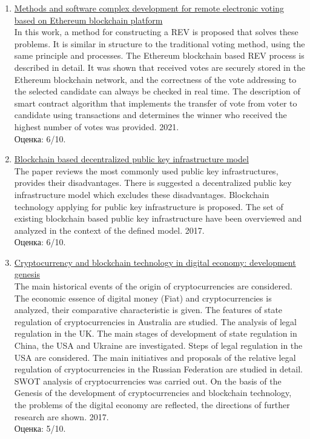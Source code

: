 \documentclass[a4paper, 12pt]{report}		%
\begin{document}
\begin{enumerate}
\item \href{https://ruslan.library.spbstu.ru/pwb/detail?db=ANALITS2005&id=8c229831-1a03-4873-b151-28e250859458}{Methods and software complex development for remote electronic voting based on Ethereum blockchain platform}\\
In this work, a method for constructing a REV is proposed that solves these problems. It is similar in structure to the traditional voting method, using the same principle and processes. The Ethereum blockchain based REV process is described in detail. It was shown that received votes are securely stored in the Ethereum blockchain network, and the correctness of the vote addressing to the selected candidate can always be checked in real time. The description of smart contract algorithm that implements the transfer of vote from voter to candidate using transactions and determines the winner who received the highest number of votes was provided. 2021.\\
Оценка: 6/10.
\item \href{https://ruslan.library.spbstu.ru/pwb/detail?db=ANALITS2005&id=RU%5CSPSTU%5Canalits2005%5C349269}{Blockchain based decentralized public key infrastructure model}\\
The paper reviews the most commonly used public key infrastructures, provides their disadvantages. There is suggested a decentralized public key infrastructure model which excludes these disadvantages. Blockchain technology applying for public key infrastructure is proposed. The set of existing blockchain based public key infrastructure have been overviewed and analyzed in the context of the defined model. 2017.\\
Оценка: 6/10.
\item \href{https://ruslan.library.spbstu.ru/pwb/detail?db=ANALITS2005&id=RU%5CSPSTU%5Canalits2005%5C349543}{Cryptocurrency and blockchain technology in digital economy: development genesis}\\
The main historical events of the origin of cryptocurrencies are considered. The economic essence of digital money (Fiat) and cryptocurrencies is analyzed, their comparative characteristic is given. The features of state regulation of cryptocurrencies in Australia are studied. The analysis of legal regulation in the UK. The main stages of development of state regulation in China, the USA and Ukraine are investigated. Steps of legal regulation in the USA are considered. The main initiatives and proposals of the relative legal regulation of cryptocurrencies in the Russian Federation are studied in detail. SWOT analysis of cryptocurrencies was carried out. On the basis of the Genesis of the development of cryptocurrencies and blockchain technology, the problems of the digital economy are reflected, the directions of further research are shown. 2017.\\
Оценка: 5/10.
\end{enumerate}
\end{document}

